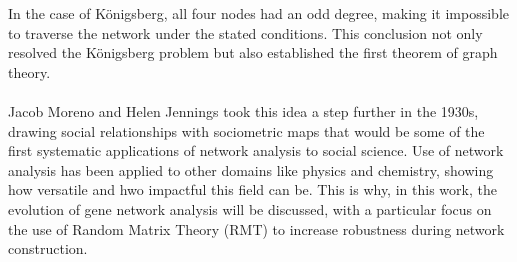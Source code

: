 \noindent In the case of Königsberg, all four nodes had an odd degree, making it impossible to traverse the network under the stated conditions.
This conclusion not only resolved the Königsberg problem but also established the first theorem of graph theory.
\\\\
Jacob Moreno and Helen Jennings took this idea a step further in the 1930s, drawing social relationships with sociometric maps that would be some of the first systematic applications of network analysis to social science\cite{moreno_who_1934}.
Use of network analysis has been applied to other domains like physics\cite{kirchhoff_solution_1958} and chemistry\cite{arthur_mathematical_1896}, showing how versatile and hwo impactful this field can be.
This is why, in this work, the evolution of gene network analysis will be discussed, with a particular focus on the use of Random Matrix Theory (RMT) to increase robustness during network construction.


